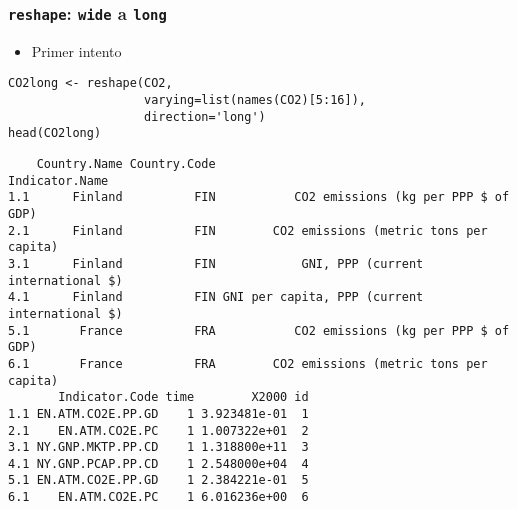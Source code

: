 \documentclass[xcolor={usenames,svgnames,dvipsnames}]{beamer}
\begin{document}
\begin{frame}[fragile]
\frametitle{\texttt{reshape}: \texttt{wide} a \texttt{long}}
\label{sec-4-3}

\begin{itemize}
\item Primer intento
\end{itemize}

\lstset{language=R}
\begin{lstlisting}
CO2long <- reshape(CO2,
                   varying=list(names(CO2)[5:16]),
                   direction='long')
head(CO2long)
\end{lstlisting}


\begin{verbatim}
    Country.Name Country.Code                                Indicator.Name
1.1      Finland          FIN           CO2 emissions (kg per PPP $ of GDP)
2.1      Finland          FIN        CO2 emissions (metric tons per capita)
3.1      Finland          FIN            GNI, PPP (current international $)
4.1      Finland          FIN GNI per capita, PPP (current international $)
5.1       France          FRA           CO2 emissions (kg per PPP $ of GDP)
6.1       France          FRA        CO2 emissions (metric tons per capita)
       Indicator.Code time        X2000 id
1.1 EN.ATM.CO2E.PP.GD    1 3.923481e-01  1
2.1    EN.ATM.CO2E.PC    1 1.007322e+01  2
3.1 NY.GNP.MKTP.PP.CD    1 1.318800e+11  3
4.1 NY.GNP.PCAP.PP.CD    1 2.548000e+04  4
5.1 EN.ATM.CO2E.PP.GD    1 2.384221e-01  5
6.1    EN.ATM.CO2E.PC    1 6.016236e+00  6
\end{verbatim}
\end{frame}
\end{document}
